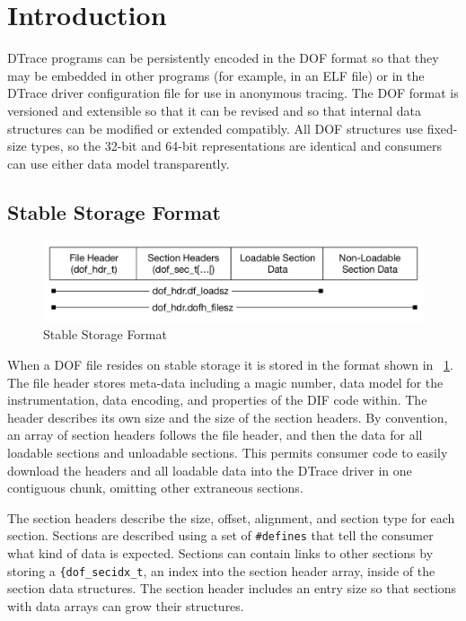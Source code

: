 \section{Introduction}
\label{sec:dof-intro}

DTrace programs can be persistently encoded in the DOF format so that
they may be embedded in other programs (for example, in an ELF file)
or in the DTrace driver configuration file for use in anonymous
tracing.  The DOF format is versioned and extensible so that it can be
revised and so that internal data structures can be modified or
extended compatibly.  All DOF structures use fixed-size types, so the
32-bit and 64-bit representations are identical and consumers can use
either data model transparently.

\subsection{Stable Storage Format}
\label{sec:dof-stable-storage}

\begin{figure}[h]
  \centering
  \includegraphics[width=.8\textwidth]{dof-stable-format}
  \caption{Stable Storage Format}
  \label{fig:stable-storage-format}
\end{figure}


When a DOF file resides on stable storage it is stored in the format
shown in ~\ref{fig:stable-storage-format}. The file header stores
meta-data including a magic number, data model for the
instrumentation, data encoding, and properties of the DIF code within.
The header describes its own size and the size of the section headers.
By convention, an array of section headers follows the file header,
and then the data for all loadable sections and unloadable sections.
This permits consumer code to easily download the headers and all
loadable data into the DTrace driver in one contiguous chunk, omitting
other extraneous sections.

The section headers describe the size, offset, alignment, and section
type for each section.  Sections are described using a set of \verb|#defines|
that tell the consumer what kind of data is expected.  Sections can
contain links to other sections by storing a \verb|{dof_secidx_t|, an index
into the section header array, inside of the section data structures.
The section header includes an entry size so that sections with data
arrays can grow their structures.

